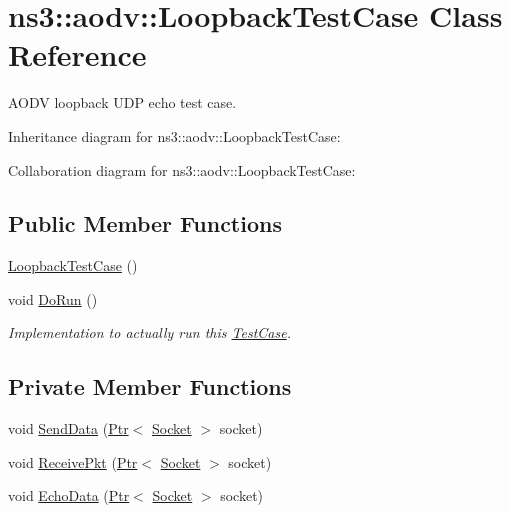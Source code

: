 \hypertarget{classns3_1_1aodv_1_1LoopbackTestCase}{}\section{ns3\+:\+:aodv\+:\+:Loopback\+Test\+Case Class Reference}
\label{classns3_1_1aodv_1_1LoopbackTestCase}


A\+O\+DV loopback U\+DP echo test case.  




Inheritance diagram for ns3\+:\+:aodv\+:\+:Loopback\+Test\+Case\+:


Collaboration diagram for ns3\+:\+:aodv\+:\+:Loopback\+Test\+Case\+:
\subsection*{Public Member Functions}
\begin{DoxyCompactItemize}
\item 
\hyperlink{classns3_1_1aodv_1_1LoopbackTestCase_a3615848b712f3432e159be48dd12d4fa}{Loopback\+Test\+Case} ()
\item 
void \hyperlink{classns3_1_1aodv_1_1LoopbackTestCase_aa4ecd46f743a971813870cff58563eab}{Do\+Run} ()
\begin{DoxyCompactList}\small\item\em Implementation to actually run this \hyperlink{classns3_1_1TestCase}{Test\+Case}. \end{DoxyCompactList}\end{DoxyCompactItemize}
\subsection*{Private Member Functions}
\begin{DoxyCompactItemize}
\item 
void \hyperlink{classns3_1_1aodv_1_1LoopbackTestCase_a703cd6374b8b35680e0ac5c8bbb8a65c}{Send\+Data} (\hyperlink{classns3_1_1Ptr}{Ptr}$<$ \hyperlink{classns3_1_1Socket}{Socket} $>$ socket)
\item 
void \hyperlink{classns3_1_1aodv_1_1LoopbackTestCase_ac459bb35a8d0594e35307ba239a7cfc6}{Receive\+Pkt} (\hyperlink{classns3_1_1Ptr}{Ptr}$<$ \hyperlink{classns3_1_1Socket}{Socket} $>$ socket)
\item 
void \hyperlink{classns3_1_1aodv_1_1LoopbackTestCase_a42ff3dfd76f3816cd5682c132fc6bcb1}{Echo\+Data} (\hyperlink{classns3_1_1Ptr}{Ptr}$<$ \hyperlink{classns3_1_1Socket}{Socket} $>$ socket)
\end{DoxyCompactItemize}
